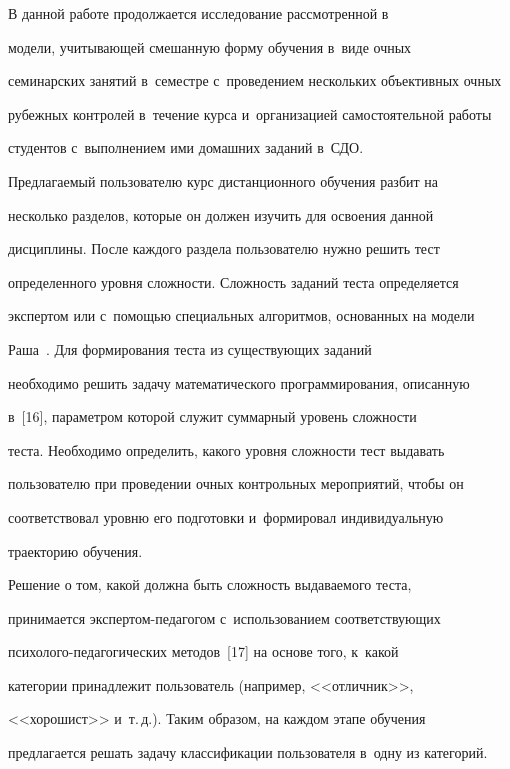     В данной работе продолжается исследование рассмотренной в~\cite{4-nau} 


модели, учитывающей смешанную форму обуче\-ния в~виде очных 


семинарских занятий в~семестре с~проведением нескольких объективных очных 


рубежных контролей в~течение курса и~организацией самостоятельной работы 


студентов с~выполнением ими домашних заданий в~СДО. 


    


     Предлагаемый пользователю курс дистанционного обучения разбит на 


несколько разделов, которые он должен изучить для освоения данной 


дисциплины. После каждого раздела пользователю нужно решить тест 


определенного уровня слож\-ности. Сложность заданий теста определяется 


экспертом или с~по\-мощью специальных алгоритмов, основанных на модели 


Раша~\cite{7-nau}. Для формирования теста из существующих заданий 


необходимо решить задачу математического программирования, описанную 


в~[16], па\-ра\-мет\-ром которой служит суммарный уровень слож\-ности 


 тес\-та. Необходимо определить, какого уровня сложности тест выдавать 


пользователю при проведении очных контрольных мероприятий, чтобы он 


соответствовал уровню его подготовки и~формировал индивидуальную 


траекторию обуче\-ния.


     


     Решение о том, какой должна быть сложность выдаваемого теста, 


принимается экс\-пер\-том-пе\-да\-го\-гом с~использованием соответствующих  


пси\-хо\-ло\-го-пе\-да\-го\-ги\-че\-ских методов~[17] на основе того, к~какой 


категории принадлежит пользователь (например, <<отличник>>, 


<<хорошист>> и~т.\,д.). Таким образом, на каждом этапе обуче\-ния 


предлагается решать задачу классификации пользователя в~одну из категорий. 


